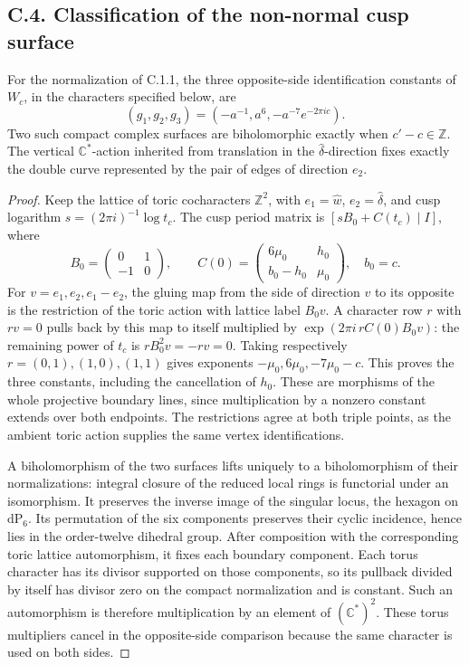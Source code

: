 \subsection{C.4. Classification of the non-normal cusp surface}
\begin{theorem}\label{fam:src:C.4.1}\label{fam:st:C.4.1}
For the normalization of C.1.1, the three opposite-side identification
constants of \(W_c\), in the characters specified below, are
\[
 (g_1,g_2,g_3)=(-a^{-1},a^6,-a^{-7}e^{-2\pi ic}).
\]
Two such compact complex surfaces are biholomorphic exactly when
\(c'-c\in\mathbb Z\). The vertical \(\mathbb C^*\)-action inherited from
translation in the \(\widehat\delta\)-direction fixes exactly the double
curve represented by the pair of edges of direction \(e_2\).
\end{theorem}
\begin{proof}
Keep the lattice of toric cocharacters \(\mathbb Z^2\), with
\(e_1=\widehat w\), \(e_2=\widehat\delta\), and cusp logarithm
\(s=(2\pi i)^{-1}\log t_c\). The cusp period matrix is
\([sB_0+C(t_c)\mid I]\), where
\[
 B_0=\begin{pmatrix}0&1\\-1&0\end{pmatrix},\qquad
 C(0)=\begin{pmatrix}6\mu_0&h_0\\b_0-h_0&\mu_0\end{pmatrix},
 \quad b_0=c.
\]
For \(v=e_1,e_2,e_1-e_2\), the gluing map from the side of direction
\(v\) to its opposite is the restriction of the toric action with lattice
label \(B_0v\). A character row \(r\) with \(rv=0\) pulls back by this
map to itself multiplied by
\(\exp(2\pi i\,rC(0)B_0v)\): the remaining power of \(t_c\) is
\(rB_0^2v=-rv=0\). Taking respectively
\(r=(0,1),(1,0),(1,1)\) gives exponents
\(-\mu_0,6\mu_0,-7\mu_0-c\). This proves the three constants, including
the cancellation of \(h_0\). These are morphisms of the whole projective
boundary lines, since multiplication by a nonzero constant extends over
both endpoints. The restrictions agree at both triple points, as the
ambient toric action supplies the same vertex identifications.

A biholomorphism of the two surfaces lifts uniquely to a biholomorphism
of their normalizations: integral closure of the reduced local rings is
functorial under an isomorphism. It preserves the inverse image of the
singular locus, the hexagon on \(\mathrm{dP}_6\). Its permutation of the
six components preserves their cyclic incidence, hence lies in the
order-twelve dihedral group. After composition with the corresponding
toric lattice automorphism, it fixes each boundary component. Each torus
character has its divisor supported on those components, so its pullback
divided by itself has divisor zero on the compact normalization and is
constant. Such an automorphism is therefore multiplication by an element
of \((\mathbb C^*)^2\). These torus multipliers cancel in the opposite-side
comparison because the same character is used on both sides.


\end{proof}
